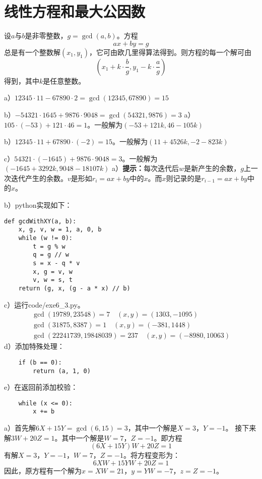 \chapter{线性方程和最大公因数}
\begin{theorem}[线性方程定理]
设$a$与$b$是非零整数，$g=\gcd(a,b)$。方程
\[ax+by=g\]
总是有一个整数解$(x_1, y_1)$，它可由欧几里得算法得到。则方程的每一个解可由
\[\left(x_1+k\cdot\frac{b}{g}, y_1-k\cdot\frac{a}{g}\right)\]
得到，其中$k$是任意整数。
\end{theorem}
%
\exercise a）$12345\cdot 11 - 67890\cdot 2=\gcd(12345, 67890) = 15$\par
b）$-54321\cdot 1645 + 9876\cdot 9048 = \gcd(54321, 9876) = 3$
%
\exercise 
a）$105\cdot(-53)+121\cdot46=1$。一般解为$(-53+121k, 46-105k)$\par
b）$12345\cdot11+67890\cdot(-2)=15$。一般解为$(11+4526k, -2-823k)$\par
c）$54321\cdot(-1645)+9876\cdot9048=3$。一般解为$(-1645+3292k, 9048-18107k)$
%
\exercise 
a）{\bf 提示：}每次迭代后$w$是新产生的余数，$g$上一次迭代产生的余数。$v$是形如$r_i = ax + by$中的$x$。而$x$则记录的是$r_{i-1} = ax + by$中的$x$。\par
b）python实现如下：
\begin{lstlisting}
def gcdWithXY(a, b):
    x, g, v, w = 1, a, 0, b
    while (w != 0):
        t = g % w
        q = g // w
        s = x - q * v
        x, g = v, w
        v, w = s, t
    return (g, x, (g - a * x) // b)
\end{lstlisting}
c）运行code/exe6\_3.py。
\begin{gather*}
\gcd(19789, 23548) = 7\quad (x,y)=(1303,-1095) \\
\gcd(31875, 8387) = 1\quad (x,y)=(-381,1448) \\
\gcd(22241739, 19848039) = 237\quad (x,y)=(-8980,10063)
\end{gather*}
d）添加特殊处理：
\begin{lstlisting}
    if (b == 0):
        return (a, 1, 0)
\end{lstlisting}
e）在返回前添加校验：
\begin{lstlisting}
    while (x <= 0):
        x += b
\end{lstlisting}
%
\exercise a）首先解$6X+15Y=\gcd(6, 15)=3$，其中一个解是$X=3$，$Y=-1$。
接下来解$3W+20Z=1$。其中一个解是$W=7$，$Z=-1$。即方程
\[(6X+15Y)W + 20Z = 1\]
有解$X=3$，$Y=-1$，$W=7$，$Z=-1$。将方程变形为：
\[6XW+15YW + 20Z = 1\]
因此，原方程有一个解为$x=XW=21$，$y=YW=-7$，$z = Z=-1$。\par
